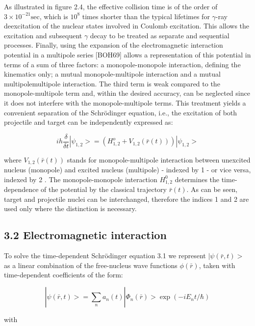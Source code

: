 \documentclass[10pt]{article}
\begin{document}
As illustrated in figure 2.4, the effective collision time is of the order of $3 \times 10^{-21} \mathrm{sec}$, which is $10^{8}$ times shorter than the typical lifetimes for $\gamma$-ray deexcitation of the nuclear states involved in Coulomb excitation. This allows the excitation and subsequent $\gamma$ decay to be treated as separate and sequential processes. Finally, using the expansion of the electromagnetic interaction potential in a multipole series [BOH69] allows a representation of this potential in terms of a sum of three factors: a monopole-monopole interaction, defining the kinematics only; a mutual monopole-multipole interaction and a mutual multipolemultipole interaction. The third term is weak compared to the monopole-multipole term and, within the desired accuracy, can be neglected since it does not interfere with the monopole-multipole terms. This treatment yields a convenient separation of the Schrödinger equation, i.e., the excitation of both projectile and target can be independently expressed as:


\begin{equation*}
i h \frac{\delta}{\delta t}\left|\psi_{1,2}>=\left(H_{1,2}^{o}+V_{1,2}(\bar{r}(t))\right)\right| \psi_{1,2}> \tag{3.1}
\end{equation*}


where $V_{1,2}(\bar{r}(t))$ stands for monopole-multipole interaction between unexcited nucleus (monopole) and excited nucleus (multipole) - indexed by 1 - or vice versa, indexed by 2 . The monopole-monopole interaction $H_{1,2}^{0}$ determines the time-dependence of the potential by the classical trajectory $\bar{r}(t)$. As can be seen, target and projectile nuclei can be interchanged, therefore the indices 1 and 2 are used only where the distinction is necessary.

\subsection*{3.2 Electromagnetic interaction}
To solve the time-dependent Schrödinger equation 3.1 we represent $\mid \psi(\bar{r}, t)>$ as a linear combination of the free-nucleus wave functions $\phi(\bar{r})$, taken with time-dependent coefficients of the form:


\begin{equation*}
\left|\psi(\bar{r}, t)>=\sum_{n} a_{n}(t)\right| \Phi_{n}(\bar{r})>\exp \left(-i E_{n} t / \hbar\right) \tag{3.2}
\end{equation*}


with
\end{document}
